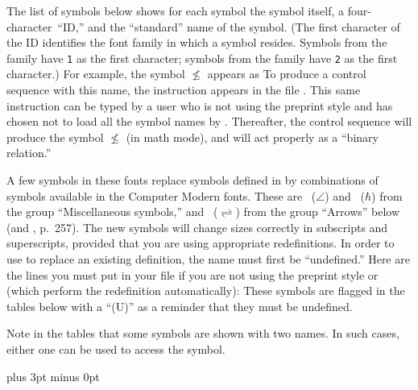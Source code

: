 The list of symbols below shows for each symbol the symbol itself, a
four-character~``ID,'' and the ``standard'' name of the symbol. 
(The first character of the ID identifies the font family in which a
symbol resides.  Symbols from the  family have {\tt1} as the
first character; symbols from the  family have {\tt2} as the
first character.)
For example, the symbol $\nleqslant$ appears as
\medskip
\noindent{}\parindent{}
\medskip
\noindent
To produce a control sequence with this name, the instruction
\medskip
\noindent{}\parindent{}
\medskip
\noindent
appears in the file \null.  This same instruction can
be typed by a user who is not using the preprint style and has chosen not
to load all the symbol names by .  Thereafter, the
control sequence  will produce the symbol $\nleqslant$
(in math mode), and will act properly as a ``binary relation.''

A few symbols in these fonts replace symbols defined in 
by combinations of symbols available in the Computer Modern fonts.  These
are ~($\angle$) and ~($\hbar$) from the group
``Miscellaneous symbols,'' and ~($\rightleftharpoons$)
from the group ``Arrows'' below (and \Joy, p.~257).  The new symbols will
change sizes correctly in subscripts and superscripts, provided that you
are using appropriate redefinitions.  In order to use  to
replace an existing definition, the name must first be ``undefined.''
Here are the lines you must put in your file if you are not using the
preprint style or  (which perform the redefinition
automatically):
\medskip
\begingroup
{}\parindent
\obeylines
{}
\endgroup
\medskip
\noindent
These symbols are flagged in the tables below with a ``{\eightpoint(U)}''
as a reminder that they must be undefined.

Note in the tables that some symbols are shown with two names.  In such
cases, either one can be used to access the symbol.

\abovedisplayskip=3pt plus 3pt minus 0pt

